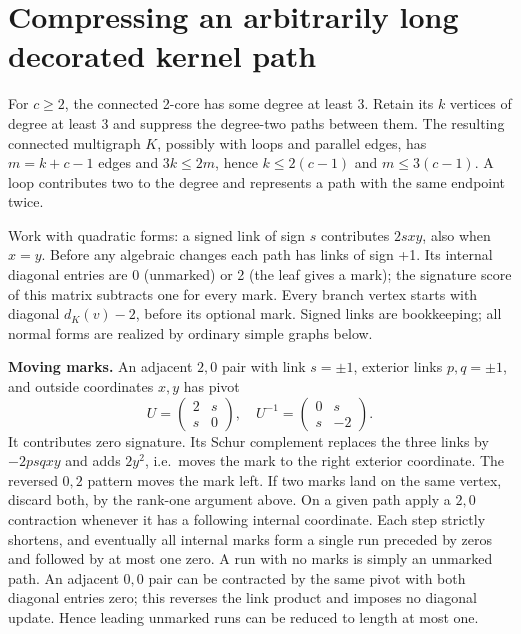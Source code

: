 \documentclass[11pt]{article}
\begin{document}
\section{Compressing an arbitrarily long decorated kernel path}\label{compressing-an-arbitrarily-long-decorated-kernel-path}

For \(c\ge 2\), the connected 2-core has some degree at least 3. Retain its \(k\) vertices of degree at least 3 and suppress the degree-two paths between them. The resulting connected multigraph \(K\), possibly with loops and parallel edges, has \(m=k+c-1\) edges and \(3k\le 2m\), hence \(k\le 2(c-1)\) and \(m\le 3(c-1)\). A loop contributes two to the degree and represents a path with the same endpoint twice.

Work with quadratic forms: a signed link of sign \(s\) contributes \(2sxy\), also when \(x=y\). Before any algebraic changes each path has links of sign +1. Its internal diagonal entries are 0 (unmarked) or 2 (the leaf gives a mark); the signature score of this matrix subtracts one for every mark. Every branch vertex starts with diagonal \(d_K(v)-2\), before its optional mark. Signed links are bookkeeping; all normal forms are realized by ordinary simple graphs below.

\textbf{Moving marks.} An adjacent \(2,0\) pair with link \(s=\pm 1\), exterior links \(p,q=\pm 1\), and outside coordinates \(x,y\) has pivot
\[
U=\begin{pmatrix}2&s\\s&0\end{pmatrix},\quad
U^{-1}=\begin{pmatrix}0&s\\s&-2\end{pmatrix}.
\]
It contributes zero signature. Its Schur complement replaces the three links by \(-2psq xy\) and adds \(2y^2\), i.e.~moves the mark to the right exterior coordinate. The reversed \(0,2\) pattern moves the mark left. If two marks land on the same vertex, discard both, by the rank-one argument above. On a given path apply a \(2,0\) contraction whenever it has a following internal coordinate. Each step strictly shortens, and eventually all internal marks form a single run preceded by zeros and followed by at most one zero. A run with no marks is simply an unmarked path. An adjacent \(0,0\) pair can be contracted by the same pivot with both diagonal entries zero; this reverses the link product and imposes no diagonal update. Hence leading unmarked runs can be reduced to length at most one.
\end{document}
